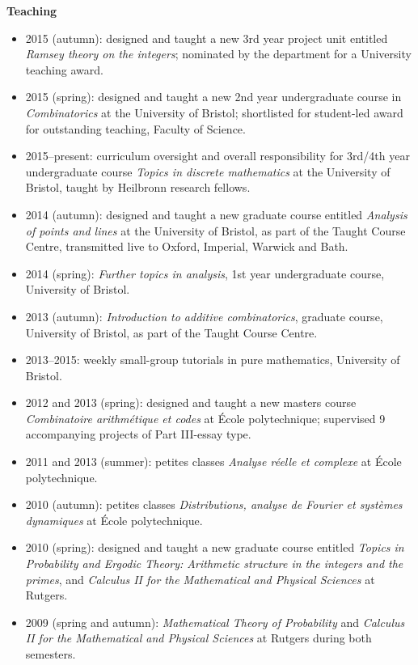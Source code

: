 \documentclass[11pt]{article}
\newenvironment{mitemize}{
\begin{itemize}
  \setlength{\itemsep}{1pt}
  \setlength{\parskip}{0pt}
  \setlength{\parsep}{0pt}
}{\end{itemize}}
\begin{document}
\vspace{3pt}
\textbf{Teaching}
\begin{mitemize}
\item 2015 (autumn): designed and taught a new 3rd year project unit entitled \textit{Ramsey theory on the integers}; nominated by the department for a University teaching award.
\item 2015 (spring): designed and taught a new 2nd year undergraduate course in \textit{Combinatorics} at the University of Bristol; shortlisted for student-led award for outstanding teaching, Faculty of Science.
\item 2015--present: curriculum oversight and overall responsibility for 3rd/4th year undergraduate course \textit{Topics in discrete mathematics} at the University of Bristol, taught by Heilbronn research fellows.
\item 2014 (autumn): designed and taught a new graduate course entitled \textit{Analysis of points and lines} at the University of Bristol, as part of the Taught Course Centre, transmitted live to Oxford, Imperial, Warwick and Bath.
\item 2014 (spring): \textit{Further topics in analysis}, 1st year undergraduate course, University of Bristol.
\item 2013 (autumn): \textit{Introduction to additive combinatorics}, graduate course, University of Bristol, as part of the Taught Course Centre.
\item 2013--2015: weekly small-group tutorials in pure mathematics, University of Bristol.
\item 2012 and 2013 (spring): designed and taught a new masters course \textit{Combinatoire arithm\'etique et codes} at \'Ecole polytechnique; supervised 9 accompanying projects of Part III-essay type.
\item 2011 and 2013 (summer): petites classes \textit{Analyse r\'eelle et complexe} at \'Ecole polytechnique.
\item 2010 (autumn): petites classes \textit{Distributions, analyse de Fourier et syst\`emes dynamiques} at \'Ecole polytechnique.
\item 2010 (spring): designed and taught a new graduate course entitled \textit{Topics in Probability and Ergodic Theory: Arithmetic structure in the integers and the primes}, and \textit{Calculus II for the Mathematical and Physical Sciences} at Rutgers.
\item 2009 (spring and autumn): \textit{Mathematical Theory of Probability} and \textit{Calculus II for the Mathematical and Physical Sciences} at Rutgers during both semesters.

\end{mitemize}
\end{document}
